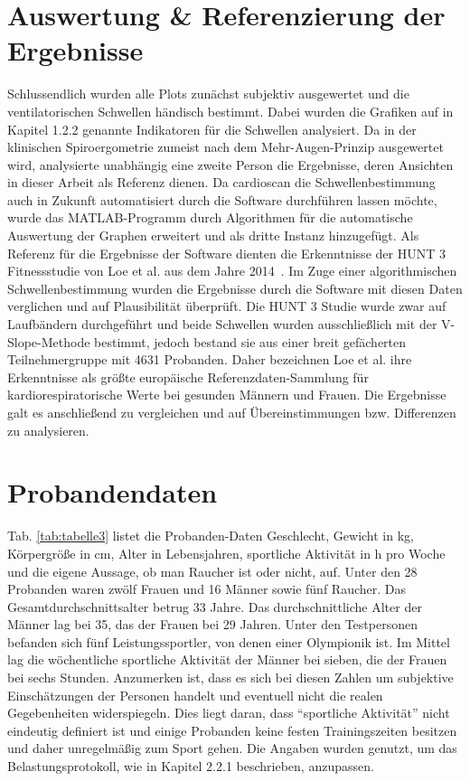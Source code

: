 \section{Auswertung \& Referenzierung der Ergebnisse}

Schlussendlich wurden alle Plots zunächst subjektiv ausgewertet und die ventilatorischen Schwellen händisch bestimmt. Dabei wurden die Grafiken auf in Kapitel 1.2.2 genannte Indikatoren für die Schwellen analysiert. Da in der klinischen Spiroergometrie zumeist nach dem Mehr-Augen-Prinzip ausgewertet wird, analysierte unabhängig eine zweite Person die Ergebnisse, deren Ansichten in dieser Arbeit als Referenz dienen. Da cardioscan die Schwellenbestimmung auch in Zukunft automatisiert durch die Software durchführen lassen möchte, wurde das MATLAB-Programm durch Algorithmen für die automatische Auswertung der Graphen erweitert und als dritte Instanz hinzugefügt. Als Referenz für die Ergebnisse der Software dienten die Erkenntnisse der HUNT 3 Fitnessstudie von Loe et al. aus dem Jahre 2014~\cite{Loe.2014}. Im Zuge einer algorithmischen Schwellenbestimmung wurden die Ergebnisse durch die Software mit diesen Daten verglichen und auf Plausibilität überprüft. Die HUNT 3 Studie wurde zwar auf Laufbändern durchgeführt und beide Schwellen wurden ausschließlich mit der V-Slope-Methode bestimmt, jedoch bestand sie aus einer breit gefächerten Teilnehmergruppe mit 4631 Probanden. Daher bezeichnen Loe et al. ihre Erkenntnisse als größte europäische Referenzdaten-Sammlung für kardiorespiratorische Werte bei gesunden Männern und Frauen. Die Ergebnisse galt es anschließend zu vergleichen und auf Übereinstimmungen bzw. Differenzen zu analysieren.

\section{Probandendaten}

Tab. \ref{tab:tabelle3} listet die Probanden-Daten Geschlecht, Gewicht in \si{\kilogram}, Körpergröße in \si{\centi\metre}, Alter in Lebensjahren, sportliche Aktivität in \si{\hour} pro Woche und die eigene Aussage, ob man Raucher ist oder nicht, auf. Unter den 28 Probanden waren zwölf Frauen und 16 Männer sowie fünf Raucher. Das Gesamtdurchschnittsalter betrug 33 Jahre. Das durchschnittliche Alter der Männer lag bei 35, das der Frauen bei 29 Jahren. Unter den Testpersonen befanden sich fünf Leistungssportler, von denen einer Olympionik ist. Im Mittel lag die wöchentliche sportliche Aktivität der Männer bei sieben, die der Frauen bei sechs Stunden. Anzumerken ist, dass es sich bei diesen Zahlen um subjektive Einschätzungen der Personen handelt und eventuell nicht die realen Gegebenheiten widerspiegeln. Dies liegt daran, dass "`sportliche Aktivität"' nicht eindeutig definiert ist und einige Probanden keine festen Trainingszeiten besitzen und daher unregelmäßig zum Sport gehen. Die Angaben wurden genutzt, um das Belastungsprotokoll, wie in Kapitel 2.2.1 beschrieben, anzupassen.

